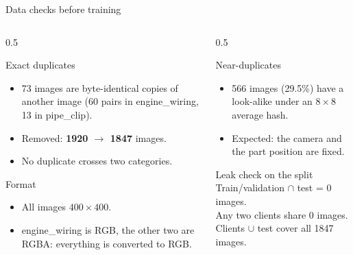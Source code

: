\documentclass[aspectratio=169,10pt]{beamer}
\begin{document}
\begin{frame}{Data checks before training}
  \begin{columns}[T]
    \begin{column}{0.5\textwidth}
      \begin{block}{Exact duplicates}
        \begin{itemize}
          \item 73 images are byte-identical copies of another image
                (60 pairs in engine\_wiring, 13 in pipe\_clip).
          \item Removed: \textbf{1920 $\rightarrow$ 1847} images.
          \item No duplicate crosses two categories.
        \end{itemize}
      \end{block}
      \begin{block}{Format}
        \begin{itemize}
          \item All images $400\times400$.
          \item engine\_wiring is RGB, the other two are RGBA:
                everything is converted to RGB.
        \end{itemize}
      \end{block}
    \end{column}
    \begin{column}{0.5\textwidth}
      \begin{block}{Near-duplicates}
        \begin{itemize}
          \item 566 images (29.5\%) have a look-alike under an $8\times8$
                average hash.
          \item Expected: the camera and the part position are fixed.
        \end{itemize}
      \end{block}
      \begin{alertblock}{Leak check on the split}
        Train/validation $\cap$ test = 0 images.\\
        Any two clients share 0 images.\\
        Clients $\cup$ test cover all 1847 images.
      \end{alertblock}
    \end{column}
  \end{columns}
\end{frame}

\end{document}
